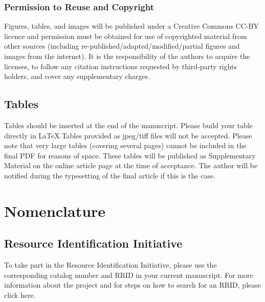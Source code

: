 \documentclass[utf8]{FrontiersinHarvard} %
\providecommand{\href}[2]{#2}
\renewcommand*{\|}[1][]{\nonscript\:#1\vert\nonscript\:\mathopen{}}
\begin{document}
\subsubsection{Permission to Reuse and Copyright}
Figures, tables, and images will be published under a Creative Commons CC-BY licence and permission must be obtained for use of copyrighted material from other sources (including re-published/adapted/modified/partial figures and images from the internet). It is the responsibility of the authors to acquire the licenses, to follow any citation instructions requested by third-party rights holders, and cover any supplementary charges.

\subsection{Tables}
Tables should be inserted at the end of the manuscript. Please build your table directly in LaTeX.Tables provided as jpeg/tiff files will not be accepted. Please note that very large tables (covering several pages) cannot be included in the final PDF for reasons of space. These tables will be published as \href{http://home.frontiersin.org/about/author-guidelines#SupplementaryMaterial}{Supplementary Material} on the online article page at the time of acceptance. The author will be notified during the typesetting of the final article if this is the case. 

\section{Nomenclature}

\subsection{Resource Identification Initiative}
To take part in the Resource Identification Initiative, please use the corresponding catalog number and RRID in your current manuscript. For more information about the project and for steps on how to search for an RRID, please click \href{http://www.frontiersin.org/files/pdf/letter_to_author.pdf}{here}.
\end{document}
